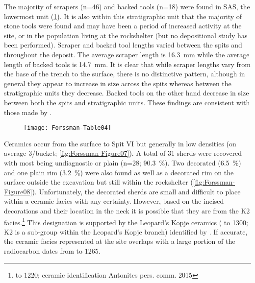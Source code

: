    The majority of scrapers (n=46) and backed tools (n=18) were found in SAS, the lowermost unit (\cref{fig:Forssman-Table04}). 
  It is also within this stratigraphic unit that the majority of stone tools were found and may have been a period of increased activity at the site, or in the population living at the rockshelter (but no depositional study has been performed). Scraper and backed tool lengths varied between the spits and throughout the deposit. The average scraper length is \SI{16.3}{\milli\meter} 
   while the average length of backed tools is \SI{14.7}{\milli\meter}. 
  It is clear that while scraper lengths vary from the base of the trench to the surface, there is no distinctive pattern, 
   although in general they appear to increase in size across the spits whereas between the stratigraphic units they decrease. Backed tools on the other hand decrease in size between both the spits and stratigraphic units. These findings are consistent with those made by \textcite[31]{Walker_1994}.
   
   	\begin{figure} %
   		\texttt{[image: Forssman-Table04]}
   		\centering
   		\label{fig:Forssman-Table04}
   	\end{figure}
   

Ceramics occur from the  surface to Spit VI but generally in low densities (on average 3/bucket; \cref{fig:Forssman-Figure07}). 
A total of 31 sherds were recovered with most being undiagnostic or plain 
(n=28; \SI{90.3}{\percent}). 
Two decorated (\SI{6.5}{\percent}) and one plain rim (\SI{3.2}{\percent}) were also found as well as a decorated rim on the surface outside the excavation but still within the rockshelter (\cref{fig:Forssman-Figure08}). 
Unfortunately, the decorated sherds are small and difficult to place within a ceramic facies with any certainty. However, based on the incised decorations and their location in the neck it is possible that they are from the K2 facies.\footnote{ to 1220; ceramic identification Antonites pers. comm. 2015} 
This designation is supported by the Leopard’s Kopje ceramics ( to 1300; K2 is a sub-group within the Leopard’s Kopje branch) identified by \textcite{Walker_1994}. 
If accurate, the ceramic facies represented at the site overlaps with a large portion of the radiocarbon dates from  to 1265.

